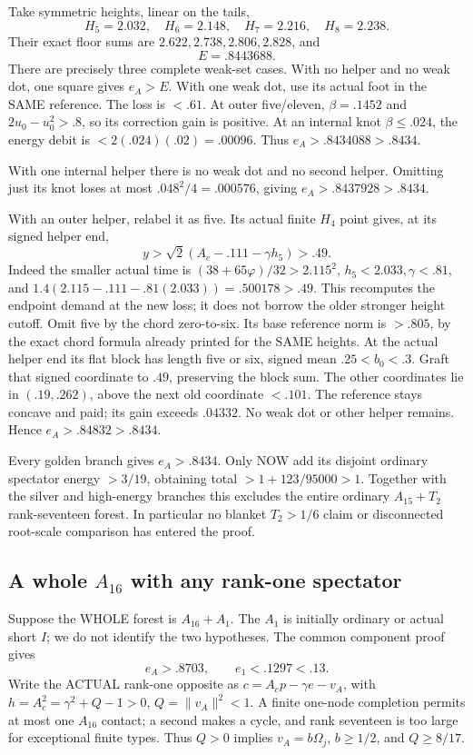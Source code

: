 \documentclass[11pt]{article}
\begin{document}
Take symmetric heights, linear on the tails,
\[
              H_5=2.032,\quad H_6=2.148,\quad
              H_7=2.216,\quad H_8=2.238 .
\]
Their exact floor sums are
\(2.622,2.738,2.806,2.828\), and
\[
                      E=.8443688 .
\]
There are precisely three complete weak-set cases.
With no helper and no weak dot,
one square gives \(e_A>E\).
With one weak dot, use its actual foot
in the SAME reference.
The loss is \(<.61\).
At outer five/eleven, \(\beta=.1452\)
and \(2u_0-u_0^2>.8\), so its correction
gain is positive.
At an internal knot \(\beta\le.024\),
the energy debit is \(<2(.024)(.02)=.00096\).
Thus \(e_A>.8434088>.8434\).

With one internal helper there is no weak
dot and no second helper.
Omitting just its knot loses at most
\(.048^2/4=.000576\), giving
\(e_A>.8437928>.8434\).

With an outer helper, relabel it as five.
Its actual finite \(H_4\) point gives,
at its signed helper end,
\[
            y>\sqrt2(A_c-.111-\gamma h_5)>.49 .
\]
Indeed the smaller actual time is
\((38+65\varphi)/32>2.115^2\),
\(h_5<2.033,\gamma<.81\), and
\(1.4(2.115-.111-.81(2.033))=.500178>.49\).
This recomputes the endpoint demand at
the new loss; it does not borrow the
older stronger height cutoff.
Omit five by the chord zero-to-six.
Its base reference norm is \(>.805\),
by the exact chord formula already printed
for the SAME heights.
At the actual helper end its flat block
has length five or six, signed mean
\(.25<b_0<.3\).
Graft that signed coordinate to \(.49\),
preserving the block sum.
The other coordinates lie in \((.19,.262)\),
above the next old coordinate \(<.101\).
The reference stays concave and paid;
its gain exceeds \(.04332\).
No weak dot or other helper remains.
Hence \(e_A>.84832>.8434\).

Every golden branch gives \(e_A>.8434\).
Only NOW add its disjoint ordinary spectator
energy \(>3/19\), obtaining total
\(>1+123/95000>1\).
Together with the silver and high-energy
branches this excludes the entire ordinary
\(A_{15}+T_2\) rank-seventeen forest.
In particular no blanket \(T_2>1/6\)
claim or disconnected root-scale comparison
has entered the proof.

\subsection[A whole A16 with any rank-one spectator]{A whole \(A_{16}\) with any rank-one spectator}
\label{app:arithA16rankone}

Suppose the WHOLE forest is \(A_{16}+A_1\).
The \(A_1\) is initially ordinary or
actual short \(I\); we do not identify
the two hypotheses.
The common component proof gives
\[
                 e_A>.8703,\qquad e_1<.1297<.13 .
\]
Write the ACTUAL rank-one opposite as
\(c=A_cp-\gamma e-v_A\), with
\(h=A_c^2=\gamma^2+Q-1>0\),
\(Q=\|v_A\|^2<1\).
A finite one-node completion permits at
most one \(A_{16}\) contact; a second
makes a cycle, and rank seventeen is
too large for exceptional finite types.
Thus \(Q>0\) implies
\(v_A=b\Omega_j\), \(b\ge1/2\), and
\(Q\ge8/17\).
\end{document}
